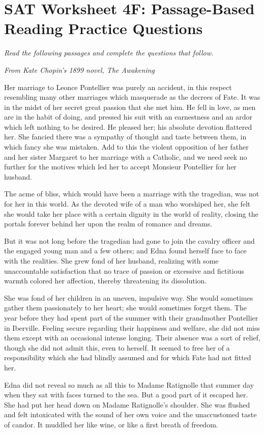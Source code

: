 \documentclass[12pt]{book}
\renewcommand{\indent}{\hspace{1cm}}
\begin{document}
\newpage
\section[Passage-Based Reading]{SAT Worksheet 4F: Passage-Based Reading Practice Questions}
\textit{Read the following passages and complete the questions that follow.}

\bigskip
\textit{From Kate Chopin's 1899 novel, The Awakening}

\bigskip
\begin{linenumbers*}
\modulolinenumbers[5]
\indent Her marriage to Leonce Pontellier was purely an accident, in this respect resembling many other marriages which masquerade as the decrees of Fate. It was in the midst of her secret great passion that she met him. He fell in love, as men are in the habit of doing, and pressed his suit with an earnestness and an ardor which left nothing to be desired. He pleased her; his absolute devotion flattered her. She fancied there was a sympathy of thought and taste between them, in which fancy she was mistaken. Add to this the violent opposition of her father and her sister Margaret to her marriage with a Catholic, and we need seek no further for the motives which led her to accept Monsieur Pontellier for her husband.

\indent The acme of bliss, which would have been a marriage with the tragedian, was not for her in this world. As the devoted wife of a man who worshiped her, she felt she would take her place with a certain dignity in the world of reality, closing the portals forever behind her upon the realm of romance and dreams.

\indent But it was not long before the tragedian had gone to join the cavalry officer and the engaged young man and a few others; and Edna found herself face to face with the realities. She grew fond of her husband, realizing with some unaccountable satisfaction that no trace of passion or excessive and fictitious warmth colored her affection, thereby threatening its dissolution.

\indent She was fond of her children in an uneven, impulsive way. She would sometimes gather them passionately to her heart; she would sometimes forget them. The year before they had spent part of the summer with their grandmother Pontellier in Iberville. Feeling secure regarding their happiness and welfare, she did not miss them except with an occasional intense longing. Their absence was a sort of relief, though she did not admit this, even to herself. It seemed to free her of a responsibility which she had blindly assumed and for which Fate had not fitted her.

\indent Edna did not reveal so much as all this to Madame Ratignolle that summer day when they sat with faces turned to the sea. But a good part of it escaped her. She had put her head down on Madame Ratignolle's shoulder. She was flushed and felt intoxicated with the sound of her own voice and the unaccustomed taste of candor. It muddled her like wine, or like a first breath of freedom.
\end{linenumbers*}
\end{document}
